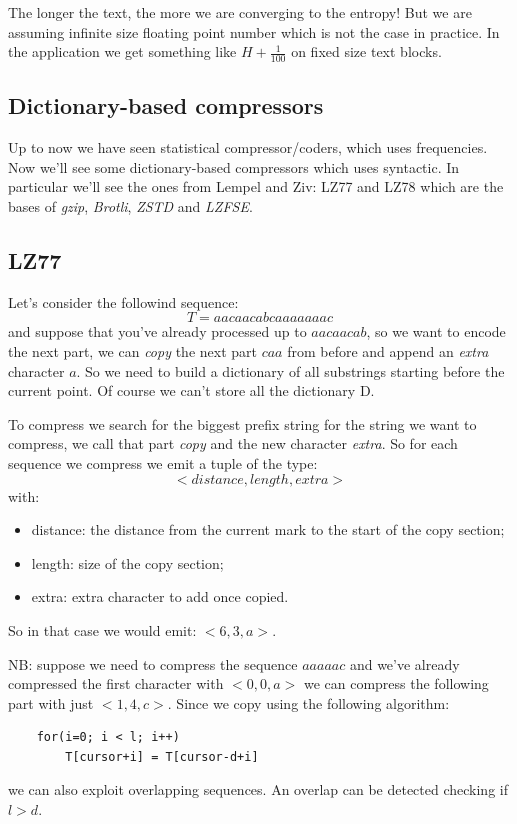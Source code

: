 The longer the text, the more we are converging to the entropy!
But we are assuming infinite size floating point number which is not the case in practice.
In the application we get something like $H + \frac{1}{100}$ on fixed size text blocks.

\subsection{Dictionary-based compressors}
Up to now we have seen statistical compressor/coders, which uses frequencies.
Now we'll see some dictionary-based compressors which uses syntactic.
In particular we'll see the ones from Lempel and Ziv: LZ77 and LZ78 which are the bases of \emph{gzip}, \emph{Brotli}, \emph{ZSTD} and \emph{LZFSE}.

\subsection{LZ77}
Let's consider the followind sequence:
$$
    T = aacaacabcaaaaaaac
$$
and suppose that you've already processed up to $aacaacab$, so we want to encode the next part, we can \emph{copy} the next part $caa$ from before and append an \emph{extra} character $a$.
So we need to build a dictionary of all substrings starting before the current point.
Of course we can't store all the dictionary D.

To compress we search for the biggest prefix string for the string we want to compress, we call that part \emph{copy} and the new character \emph{extra}.
So for each sequence we compress we emit a tuple of the type:
$$
    <distance, length, extra>
$$
with:
\begin{itemize}
    \item distance: the distance from the current mark to the start of the copy section;
    \item length: size of the copy section;
    \item extra: extra character to add once copied.
\end{itemize}

So in that case we would emit: $<6, 3, a>$.

NB: suppose we need to compress the sequence $aaaaac$ and we've already compressed the first character with $<0, 0, a>$ we can compress the following part with just $<1, 4, c>$.
Since we copy using the following algorithm:
\begin{verbatim}
    for(i=0; i < l; i++)
        T[cursor+i] = T[cursor-d+i]
\end{verbatim}
we can also exploit overlapping sequences.
An overlap can be detected checking if $l > d$.

